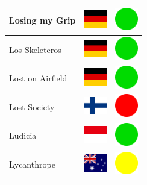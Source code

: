 \documentclass[12pt, a4paper, twoside]{report}
\begin{document}
\begin{center}
\begin{longtable}{|p{5cm}|p{2cm}|p{2cm}|}
 Losing my Grip                                             & \includegraphics[width=1cm]{4x3/de} &   \includegraphics[width=1cm]{likes/y} \\ \hline
 Los Skeleteros                                             & \includegraphics[width=1cm]{4x3/de} &   \includegraphics[width=1cm]{likes/y} \\ \hline
 Lost on Airfield                                           & \includegraphics[width=1cm]{4x3/de} &   \includegraphics[width=1cm]{likes/y} \\ \hline
 Lost Society                                               & \includegraphics[width=1cm]{4x3/fi} &   \includegraphics[width=1cm]{likes/n} \\ \hline
 Ludicia                                                    & \includegraphics[width=1cm]{4x3/id} &   \includegraphics[width=1cm]{likes/y} \\ \hline
 Lycanthrope                                                & \includegraphics[width=1cm]{4x3/au} &   \includegraphics[width=1cm]{likes/m} \\ \hline

\end{longtable}
\end{center}
\end{document}
